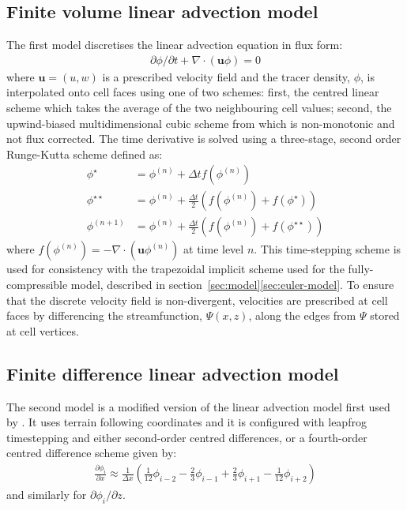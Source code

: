 \documentclass{ametsoc}
\begin{document}
\subsection{Finite volume linear advection model}
The first model discretises the linear advection equation in flux form:
\begin{align}
\partial \phi / \partial t + \nabla \cdot \left( \mathbf{u} \phi \right) = 0
\label{eq:advect}
\end{align}
where $\mathbf{u} = (u, w)$ is a prescribed velocity field and the tracer density, $\phi$, is interpolated onto cell faces using one of two schemes: first, the centred linear scheme which takes the average of the two neighbouring cell values; second, the upwind-biased multidimensional cubic scheme from \citet{weller-shahrokhi2014} which is non-monotonic and not flux corrected.
The time derivative is solved using a three-stage, second order Runge-Kutta scheme defined as:
\begin{subequations}
\begin{align}
	\phi^\star &= \phi^{(n)} + \Delta t f(\phi^{(n)}) \\
	\phi^{\star\star} &= \phi^{(n)} + \frac{\Delta t}{2} \left( f(\phi^{(n)}) + f(\phi^\star) \right) \\
	\phi^{(n+1)} &= \phi^{(n)} + \frac{\Delta t}{2} \left( f(\phi^{(n)}) + f(\phi^{\star\star}) \right)
\end{align}
\end{subequations}
where \(f(\phi^{(n)}) = - \nabla \cdot (\mathbf{u} \phi^{(n)})\) at time level \(n\).  This time-stepping scheme is used for consistency with the trapezoidal implicit scheme used for the fully-compressible model, described in section~\ref{sec:model}\ref{sec:euler-model}.
To ensure that the discrete velocity field is non-divergent, velocities are prescribed at cell faces by differencing the streamfunction, \(\Psi(x, z)\), along the edges from \(\Psi\) stored at cell vertices.

\subsection{Finite difference linear advection model}
The second model is a modified version of the linear advection model first used by \citet{schaer2002}.  It uses terrain following coordinates and it is configured with leapfrog timestepping and either second-order centred differences, or a fourth-order centred difference scheme given by:
\begin{align}
	\frac{\partial \phi_i}{\partial x} \approx \frac{1}{\Delta x} \left( \frac{1}{12} \phi_{i-2} - \frac{2}{3} \phi_{i-1} + \frac{2}{3} \phi_{i+1} - \frac{1}{12} \phi_{i+2} \right)
\end{align}
and similarly for \(\partial \phi_i / \partial z\).
\end{document}
